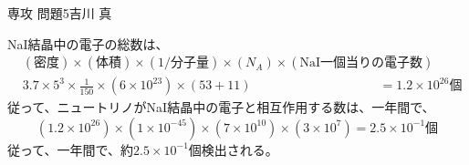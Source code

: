 \documentclass[fleqn]{jbook}
\begin{document}
\begin{answer}{専攻 問題5}{吉川 真}
\begin{subanswers}
  \SubAnswer NaI結晶中の電子の総数は、
  \begin{eqnarray*}
   & (\mbox{密度})\times(\mbox{体積})\times(\mbox{1/分子量})
    \times(N_A)\times(\mbox{NaI一個当りの電子数}) & \\
   & 3.7\times5^3\times\frac{1}{150}\times(6\times10^{23})\times(53+11)
    & =1.2\times 10^{26}\mbox{個}
  \end{eqnarray*}
  従って、ニュートリノがNaI結晶中の電子と相互作用する数は、一年間で、
  \[
   (1.2\times10^{26})\times(1\times10^{-45})\times
  (7\times10^{10})\times(3\times10^7)=2.5\times10^{-1}\mbox{個}
  \]
  従って、一年間で、約$2.5\times10^{-1}$個検出される。
\end{subanswers}
\end{answer}
\end{document}
